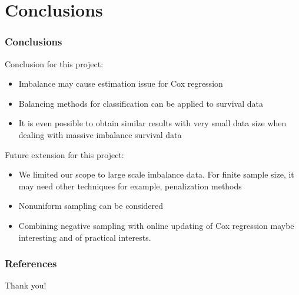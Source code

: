 \documentclass{beamer}
\begin{document}
        \section{Conclusions}
	\begin{frame}
		\frametitle{Conclusions}
        Conclusion for this project:
		\begin{itemize} 
            \item Imbalance may cause estimation issue for Cox regression
            \item Balancing methods for classification can be applied to survival data
            \item It is even possible to obtain similar results with very small data size when dealing with massive imbalance survival data
	    \end{itemize}
        Future extension for this project:
        \begin{itemize}
            \item We limited our scope to large scale imbalance data. For finite sample size, it may need other techniques for example, penalization methods
            \item Nonuniform sampling can be considered
            \item Combining negative sampling with online updating of Cox regression maybe interesting and of practical interests.
        \end{itemize}

       \end{frame}
	\begin{frame}
		\frametitle{References}
		
        
	\end{frame}	
	
	\begin{frame}
		\Huge{\centerline{Thank you!}}
	\end{frame}
	
	
\end{document}
